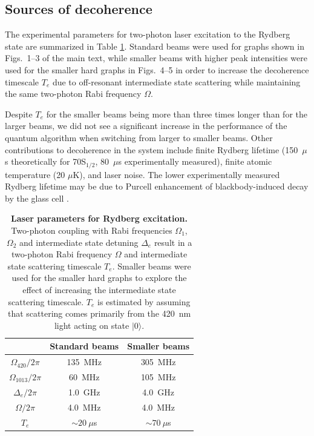 \documentclass[twocolumn,amssymb,secnumarabic, prl, aps, nofootinbib]{revtex4-1}
\begin{document}
\subsection{Sources of decoherence}

The experimental parameters for two-photon laser excitation to the Rydberg state are summarized in Table \ref{table:rydberglasers}. Standard beams were used for graphs shown in Figs.~1--3 of the main text, while smaller beams with higher peak intensities were used for the smaller hard graphs in Figs.~4--5 in order to increase the decoherence timescale $T_e$ due to off-resonant intermediate state scattering while maintaining the same two-photon Rabi frequency $\Omega$.

Despite $T_e$ for the smaller beams being more than three times longer than for the larger beams, we did not see a significant increase in the performance of  the quantum algorithm when switching from larger to smaller beams. Other contributions to decoherence in the system include finite Rydberg lifetime (150~$\mu$s theoretically for 70S$_{1/2}$, 80~$\mu$s experimentally measured), finite atomic temperature (20 $\mu$K), and laser noise. The lower experimentally measured Rydberg lifetime may be due to Purcell enhancement of blackbody-induced decay  by the glass cell \cite{archimi2021measurements}.

\begin{table}
	\begin{center}
		\begin{tabular}{|c||c|c|} 
			\hline
			& \textbf{Standard beams} & \textbf{Smaller beams}\\
			\hline\hline
			$\Omega_{420} / 2\pi$ & 135~MHz & 305~MHz \\
			$\Omega_{1013}/ 2\pi$ & 60~MHz & 105~MHz \\
			$\Delta_e/ 2\pi$ & 1.0~GHz & 4.0~GHz \\
			\hline
			$\Omega/ 2\pi$ & 4.0~MHz & 4.0~MHz \\
			$T_e$ & $\sim 20~\mu$s & $\sim 70~\mu$s \\
			\hline
		\end{tabular}
	\end{center}
	\caption{\textbf{Laser parameters for Rydberg excitation.} Two-photon coupling with Rabi frequencies $\Omega_1$, $\Omega_2$ and intermediate state detuning $\Delta_e$ result in a two-photon Rabi frequency $\Omega$ and intermediate state scattering timescale $T_e$. Smaller beams were used for the smaller hard graphs to explore the effect of increasing the intermediate state scattering timescale. $T_e$ is estimated by assuming that scattering comes primarily from the 420~nm light acting on state $|0\rangle$.}
	\label{table:rydberglasers}
\end{table}
\end{document}
